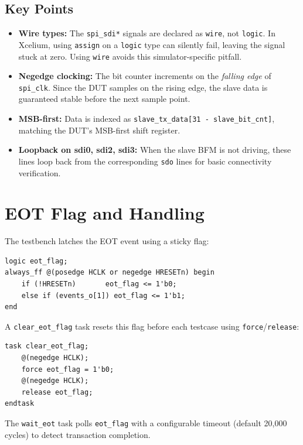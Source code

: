 \subsection{Key Points}

\begin{itemize}[leftmargin=2em]
  \item \textbf{Wire types:} The \texttt{spi\_sdi*} signals are declared as \texttt{wire}, not
        \texttt{logic}. In Xcelium, using \texttt{assign} on a \texttt{logic} type can silently
        fail, leaving the signal stuck at zero. Using \texttt{wire} avoids this simulator-specific
        pitfall.
  \item \textbf{Negedge clocking:} The bit counter increments on the \emph{falling edge} of
        \texttt{spi\_clk}. Since the DUT samples on the rising edge, the slave data is guaranteed
        stable before the next sample point.
  \item \textbf{MSB-first:} Data is indexed as \texttt{slave\_tx\_data[31 - slave\_bit\_cnt]},
        matching the DUT's MSB-first shift register.
  \item \textbf{Loopback on sdi0, sdi2, sdi3:} When the slave BFM is not driving, these lines
        loop back from the corresponding \texttt{sdo} lines for basic connectivity verification.
\end{itemize}

\section{EOT Flag and Handling}

The testbench latches the EOT event using a sticky flag:
\begin{lstlisting}
logic eot_flag;
always_ff @(posedge HCLK or negedge HRESETn) begin
    if (!HRESETn)       eot_flag <= 1'b0;
    else if (events_o[1]) eot_flag <= 1'b1;
end
\end{lstlisting}

A \texttt{clear\_eot\_flag} task resets this flag before each testcase using \texttt{force}/\texttt{release}:
\begin{lstlisting}
task clear_eot_flag;
    @(negedge HCLK);
    force eot_flag = 1'b0;
    @(negedge HCLK);
    release eot_flag;
endtask
\end{lstlisting}

The \texttt{wait\_eot} task polls \texttt{eot\_flag} with a configurable timeout (default 20,000 cycles)
to detect transaction completion.

